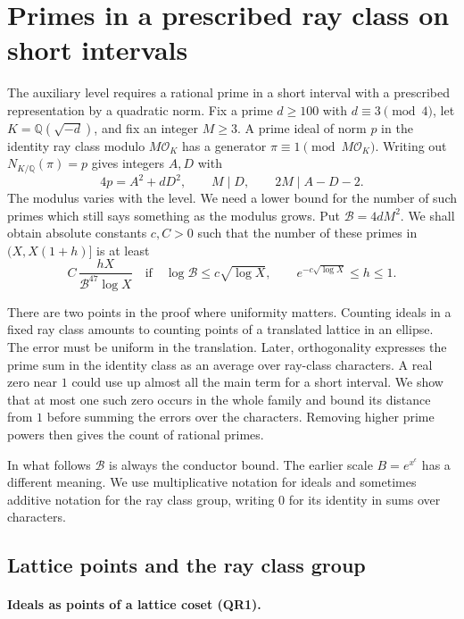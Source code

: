 \section{Primes in a prescribed ray class on short intervals}
\label{sec:ray-prime-estimates}

The auxiliary level requires a rational prime in a short interval with a
prescribed representation by a quadratic norm. Fix a prime $d\ge100$ with
$d\equiv3\pmod4$, let $K=\mathbb Q(\sqrt{-d})$, and fix an integer
$M\ge3$. A prime ideal of norm $p$ in the identity ray class modulo
$M\mathcal O_K$ has a generator $\pi\equiv1\pmod{M\mathcal O_K}$.
Writing out $N_{K/\mathbb Q}(\pi)=p$ gives integers $A,D$ with
\[
 4p=A^2+dD^2,\qquad M\mid D,\qquad 2M\mid A-D-2 .
\]
The modulus varies with the level. We need a lower bound for the number
of such primes which still says something as the modulus grows.
Put $\mathcal B=4dM^2$. We shall obtain absolute constants $c,C>0$ such that
the number of these primes in $(X,X(1+h)]$ is at least
\[
   C\,\frac{hX}{\mathcal B^{47}\log X}
   \quad\text{if}\quad
   \log\mathcal B\le c\sqrt{\log X},
   \qquad e^{-c\sqrt{\log X}}\le h\le1 .
\]

There are two points in the proof where uniformity matters. Counting ideals
in a fixed ray class amounts to counting points of a translated lattice in an
ellipse. The error must be uniform in the translation. Later, orthogonality
expresses the prime sum in the identity class as an average over ray-class
characters. A real zero near $1$ could use up almost all the main term for a short
interval. We show that at most one such zero occurs in the whole family and
bound its distance from $1$ before summing the errors over the characters.
Removing higher prime powers then gives the count of rational primes.

In what follows $\mathcal B$ is always the conductor bound. The earlier scale
$B=e^{x^\epsilon}$ has a different meaning. We use multiplicative notation for
ideals and sometimes additive notation for the ray class group, writing $0$ for
its identity in sums over characters.


\subsection{Lattice points and the ray class group}

\paragraph{Ideals as points of a lattice coset (QR1).}

